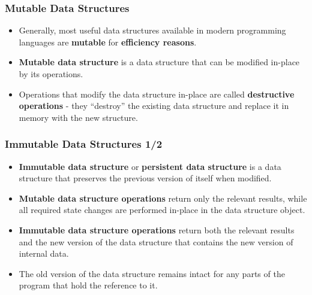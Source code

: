 \documentclass{beamer}
\begin{document}
\begin{frame}[fragile]
  \frametitle{Mutable Data Structures}
  \begin{itemize}
  \item Generally, most useful data structures available in modern programming
    languages are \textbf{mutable} for \textbf{efficiency reasons}.
  \item \textbf{Mutable data structure} is a data structure that can be modified
    in-place by its operations.
  \item Operations that modify the data structure in-place are called
    \textbf{destructive operations} - they ``destroy'' the existing data
    structure and replace it in memory with the new structure.
  \end{itemize}
\end{frame}

\begin{frame}[fragile]
  \frametitle{Immutable Data Structures 1/2}
  \begin{itemize}
  \item \textbf{Immutable data structure} or \textbf{persistent data structure}
    is a data structure that preserves the previous version of itself when
    modified.
  \item \textbf{Mutable data structure operations} return only the relevant
    results, while all required state changes are performed in-place in the data
    structure object.
  \item \textbf{Immutable data structure operations} return both the relevant
    results and the new version of the data structure that contains the new
    version of internal data.
  \item The old version of the data structure remains intact for any parts of
    the program that hold the reference to it.
  \end{itemize}
\end{frame}
\end{document}
